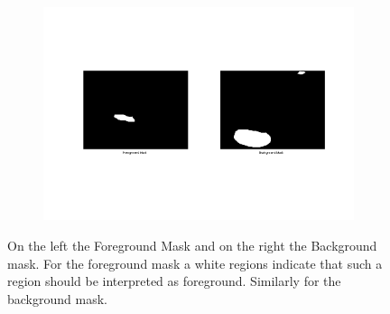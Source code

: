 \documentclass{paper}
\begin{document}
\begin{figure}[H]
    \centering
    \begin{subfigure}{1.0\textwidth}
        \includegraphics[width=\textwidth]{../../outputs/p4/image_segmentation/sheeps/masks}
    \end{subfigure}
    \caption{On the left the Foreground Mask and on the right the Background mask. For the foreground mask a white regions indicate that such a region should be interpreted as foreground. Similarly for the background mask.}
    \label{fig:segmentation_sheeps_masks}       
\end{figure}
\end{document}
